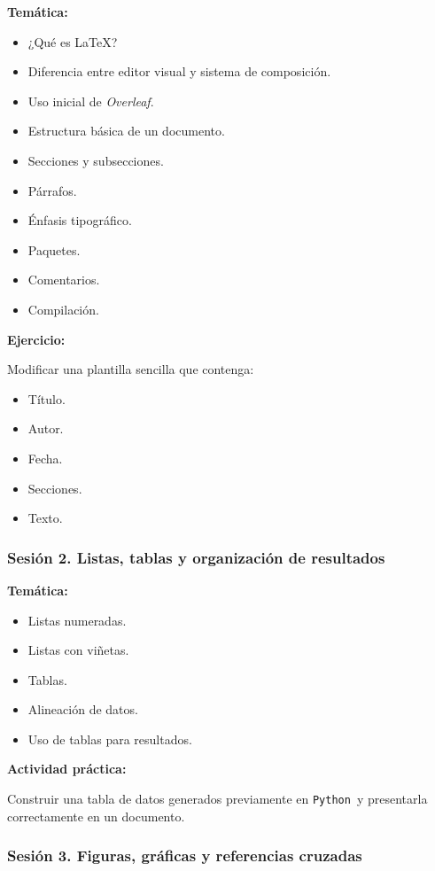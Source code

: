 \documentclass[12pt,letterpaper]{article}
\newcommand{\python}{\texttt{Python}}
\newcommand{\latexname}{\LaTeX}
\newcommand{\overleaf}{\textit{Overleaf}}
\begin{document}
\textbf{Temática:}
\begin{itemize}[noitemsep]
    \item ¿Qué es \latexname?
    \item Diferencia entre editor visual y sistema de composición. 
    \item Uso inicial de \overleaf. 
    \item Estructura básica de un documento.
    \item Secciones y subsecciones.
    \item Párrafos.
    \item Énfasis tipográfico.
    \item Paquetes.
    \item Comentarios.
    \item Compilación.
\end{itemize}

\textbf{Ejercicio:}

Modificar una plantilla sencilla que contenga:

\begin{itemize}[noitemsep]
    \item Título.
    \item Autor.
    \item Fecha.
    \item Secciones.
    \item Texto.
\end{itemize}
\subsubsection*{Sesión 2. Listas, tablas y organización de resultados}

\textbf{Temática:}
\begin{itemize}[noitemsep]
    \item Listas numeradas.
    \item Listas con viñetas.
    \item Tablas.
    \item Alineación de datos.
    \item Uso de tablas para resultados.
\end{itemize}

\textbf{Actividad práctica:}

Construir una tabla de datos generados previamente en \python\ y presentarla correctamente en un documento.

\subsubsection*{Sesión 3. Figuras, gráficas y referencias cruzadas}
\end{document}
